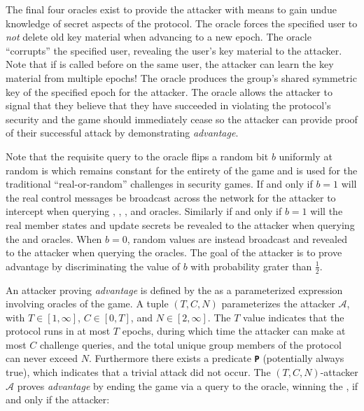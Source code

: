 The final four oracles exist to provide the attacker with means to gain undue knowledge of secret aspects of the  protocol.
The  oracle forces the specified user to \emph{not} delete old key material when advancing to a new epoch.
The  oracle ``corrupts'' the specified user, revealing the user's key material to the attacker. Note that if  is called before  on the same user, the attacker can learn the key material from multiple epochs!
The  oracle produces the group's shared symmetric key of the specified epoch for the attacker.
The  oracle allows the attacker to signal that they believe that they have succeeded in violating the  protocol's security and the game should immediately cease so the attacker can provide proof of their successful attack by demonstrating \emph{advantage}.

Note that the requisite query to the  oracle flips a random bit \(b\) uniformly at random is which remains constant for the entirety of the game and is used for the traditional ``real-or-random'' challenges in security games.
If and only if \(b=1\) will the real control messages be broadcast across the network for the attacker to intercept when querying , , , and  oracles.
Similarly if and only if \(b=1\) will the real member states and update secrets be revealed to the attacker when querying the  and  oracles.
When \(b=0\), random values are instead broadcast and revealed to the attacker when querying the oracles.
The goal of the attacker is to prove advantage by discriminating the value of \(b\) with probability grater than \(\frac{1}{2}\).

An attacker proving \emph{advantage} is defined by the \CGKAsec as a parameterized expression involving oracles of the game.
A tuple \((T, C, N)\) parameterizes the attacker \(\mathcal{A}\), with \(T \in \left[1, \infty \right]\), \(C \in \left[0, T \right]\), and \(N \in \left[2, \infty \right]\).
The \(T\) value indicates that the protocol runs in at most \(T\) epochs, during which time the attacker can make at most \(C\) challenge queries, and the total unique group members of the protocol can never exceed \(N\).
Furthermore there exists a predicate \textbf{\texttt{P}} (potentially always true), which indicates that a trivial attack did not occur.
The \((T, C, N)\)-attacker \(\mathcal{A}\) proves \emph{advantage} by ending the game via a query to the  oracle, winning the \CGKAsec, if and only if the attacker:

